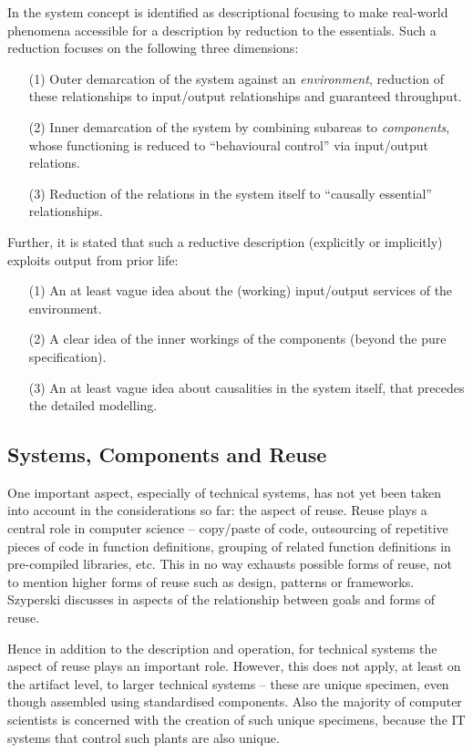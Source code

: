\documentclass[11pt,a4paper]{article}
\begin{document}
In \cite{Graebe-mts} the system concept is identified as descriptional
focusing to make real-world phenomena accessible for a description by
reduction to the essentials.  Such a reduction focuses on the following three
dimensions:
\begin{itemize}
\item[(1)] Outer demarcation of the system against an \emph{environment},
  reduction of these relationships to input/output relationships and
  guaranteed throughput.
\item[(2)] Inner demarcation of the system by combining subareas to
  \emph{components}, whose functioning is reduced to “behavioural control” via
  input/output relations.
\item[(3)] Reduction of the relations in the system itself to “causally
  essential” relationships.
\end{itemize}
Further, it is stated that such a reductive description (explicitly or
implicitly) exploits output from prior life:
\begin{itemize}
\item[(1)] An at least vague idea about the (working) input/output services of
  the environment.
\item[(2)] A clear idea of the inner workings of the components (beyond the
  pure specification).
\item[(3)] An at least vague idea about causalities in the system itself, that
  precedes the detailed modelling.
\end{itemize}

\subsection{Systems, Components and Reuse}

One important aspect, especially of technical systems, has not yet been taken
into account in the considerations so far: the aspect of reuse. Reuse plays a
central role in computer science -- copy/paste of code, outsourcing of
repetitive pieces of code in function definitions, grouping of related
function definitions in pre-compiled libraries, etc. This in no way exhausts
possible forms of reuse, not to mention higher forms of reuse such as design,
patterns or frameworks. Szyperski discusses in \cite[ch. 8]{Szyperski2002}
aspects of the relationship between goals and forms of reuse.

Hence in addition to the description and operation, for technical systems the
aspect of reuse plays an important role. However, this does not apply, at
least on the artifact level, to larger technical systems – these are unique
specimen, even though assembled using standardised components. Also the
majority of computer scientists is concerned with the creation of such unique
specimens, because the IT systems that control such plants are also unique.
\end{document}
